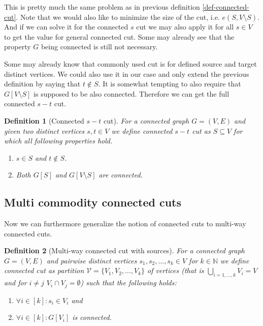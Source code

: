 \documentclass{article}
\theoremstyle{plain}
\theoremstyle{plain}
\newtheorem{defn}{Definition}
\theoremstyle{remark}
\begin{document}
	This is pretty much the same problem as in previous definition \ref{def-connected-cut}. Note that we would also like to minimize the size of the cut, i.e. $e(S, V \setminus S)$. And if we can solve it for the connected $s$ cut we may also apply it for all $s \in V$ to get the value for general connected cut. Some may already see that the property $G$ being connected is still not necessary.
	
	Some may already know that commonly used cut is for defined source and target distinct vertices. We could also use it in our case and only extend the previous definition by saying that $t \notin S$. It is somewhat tempting to also require that $G[V \setminus S]$ is supposed to be also connected. Therefore we can get the full connected $s-t$ cut.
	
	\begin{defn}[Connected $s-t$ cut]
		For a connected graph $G = (V,E)$ and given two distinct vertices $s, t \in V$ we define connected $s-t$ cut as $S \subseteq V$ for which all following properties hold.
		
		\begin{enumerate}
			\item $s \in S$ and $t \notin S$.
			\item Both $G[S]$ and $G[V \setminus S]$ are connected.
		\end{enumerate}
		\label{def-connected-s-t-cut}
	\end{defn}

	\subsection{Multi commodity connected cuts}

	Now we can furthermore generalize the notion of connected cuts to multi-way connected cuts.
	
	\begin{defn}[Multi-way connected cut with sources]
		For a connected graph $G = (V,E)$ and pairwise distinct vertices $s_1, s_2, \dots, s_k \in V$ for $k \in \mathbb{N}$ we define connected cut as partition $\mathcal{V} = \{V_1, V_2, \dots, V_k\}$ of vertices (that is $\bigcup_{i = 1, \dots, k} V_i = V$ and for $i \neq j$ $V_i \cap V_j = \emptyset$) such that the following holds:
		
		\begin{enumerate}
			\item $\forall i \in [k]: s_i \in V_i$ and
			\item $\forall i \in [k]: G[V_i]$ is connected.
		\end{enumerate}
	\end{defn}
	
\end{document}
